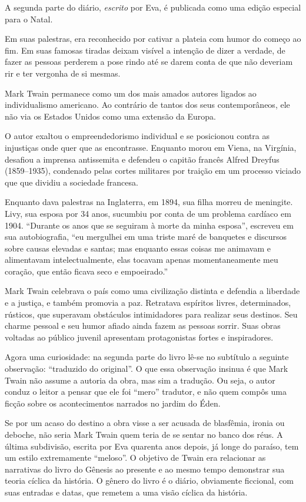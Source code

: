 \documentclass[12pt]{extarticle}
\begin{document}
A segunda parte do diário, \textit{escrito} por Eva, 
é publicada como uma edição especial para o Natal.

Em suas palestras, era reconhecido por cativar a plateia com humor do começo ao fim. 
Em suas famosas tiradas deixam visível a intenção de dizer a verdade, 
de fazer as pessoas perderem a pose rindo até se darem conta de que não
deveriam rir e ter vergonha de si mesmas.

Mark Twain permanece como um dos mais amados autores ligados ao individualismo 
americano. Ao contrário de tantos dos seus contemporâneos, ele não via os Estados Unidos 
como uma extensão da Europa. 

O autor exaltou o empreendedorismo individual e se posicionou contra as 
injustiças onde quer que as encontrasse. Enquanto morou em Viena, na Virgínia, 
desafiou a imprensa antissemita e defendeu o capitão francês Alfred Dreyfus (1859--1935), 
condenado pelas cortes militares por traição em um processo viciado que 
que dividiu a sociedade francesa.

Enquanto dava palestras na Inglaterra, em 1894, sua filha morreu de meningite. 
Livy, sua esposa por 34 anos, sucumbiu por conta de um problema cardíaco em 1904. 
``Durante os anos que se seguiram à morte da minha esposa'', 
escreveu em sua autobiografia, ``eu mergulhei em uma triste maré de 
banquetes e discursos sobre causas elevadas e santas; 
mas enquanto essas coisas me animavam e alimentavam intelectualmente, 
elas tocavam apenas momentaneamente meu coração, 
que então ficava seco e empoeirado.''

Mark Twain celebrava o país como uma civilização distinta e 
defendia a liberdade e a justiça, e também promovia a paz. 
Retratava espíritos livres, determinados, rústicos, que superavam 
obstáculos intimidadores para realizar seus destinos. 
Seu charme pessoal e seu humor afiado ainda fazem as pessoas sorrir. 
Suas obras voltadas ao público juvenil apresentam protagonistas fortes e inspiradores.

Agora uma curiosidade: na segunda parte do livro lê-se no subtítulo a 
seguinte observação: ``traduzido do original''.
O que essa observação insinua é que Mark Twain não assume a autoria da obra, 
mas sim a tradução.
Ou seja, o autor conduz o leitor a pensar que ele foi ``mero'' tradutor, 
e não quem compôs uma ficção sobre os acontecimentos narrados no jardim do Éden.

Se por um acaso do destino a obra visse a ser acusada 
de blasfêmia, ironia ou deboche, não seria Mark Twain quem 
teria de se sentar no banco dos réus.
A última subdivisão, escrita por Eva quarenta anos depois, já longe do paraíso, 
tem um estilo extremamente ``meloso''.
O objetivo de Twain era relacionar as narrativas do livro do Gênesis 
ao presente e ao mesmo tempo demonstrar sua teoria cíclica da história. 
O gênero do livro é o diário, obviamente ficcional, 
com suas entradas e datas, que remetem a uma visão cíclica da história.
\end{document}
